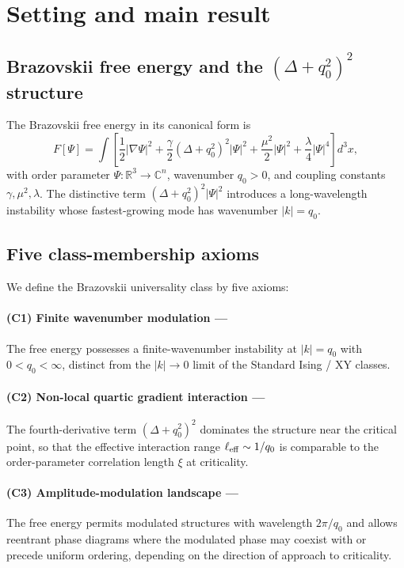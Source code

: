 \section{Setting and main result}

\subsection{Brazovskii free energy and the $(\Delta + q_0^2)^2$ structure}

The Brazovskii free energy in its canonical form is
\begin{equation}
F[\Psi] = \int\!\left[\frac{1}{2}|\nabla\Psi|^2 + \frac{\gamma}{2}(\Delta + q_0^2)^2|\Psi|^2
+ \frac{\mu^2}{2}|\Psi|^2 + \frac{\lambda}{4}|\Psi|^4\right]\!d^3x,
\label{eq:F_brazovskii}
\end{equation}
with order parameter $\Psi : \mathbb{R}^3 \to \mathbb{C}^n$, wavenumber
$q_0 > 0$, and coupling constants $\gamma, \mu^2, \lambda$. The
distinctive term $(\Delta + q_0^2)^2|\Psi|^2$ introduces a long-wavelength
instability whose fastest-growing mode has wavenumber $|k| = q_0$.

\subsection{Five class-membership axioms}

We define the Brazovskii universality class by five axioms:

\paragraph{(C1) Finite wavenumber modulation ---}
The free energy possesses a finite-wavenumber instability at
$|k| = q_0$ with $0 < q_0 < \infty$, distinct from the $|k| \to 0$
limit of the Standard Ising / XY classes.

\paragraph{(C2) Non-local quartic gradient interaction ---}
The fourth-derivative term $(\Delta + q_0^2)^2$ dominates the structure
near the critical point, so that the effective interaction range
$\ell_{\rm eff} \sim 1/q_0$ is comparable to the order-parameter
correlation length $\xi$ at criticality.

\paragraph{(C3) Amplitude-modulation landscape ---}
The free energy permits modulated structures with wavelength $2\pi/q_0$
and allows reentrant phase diagrams where the modulated phase may
coexist with or precede uniform ordering, depending on the direction
of approach to criticality.

